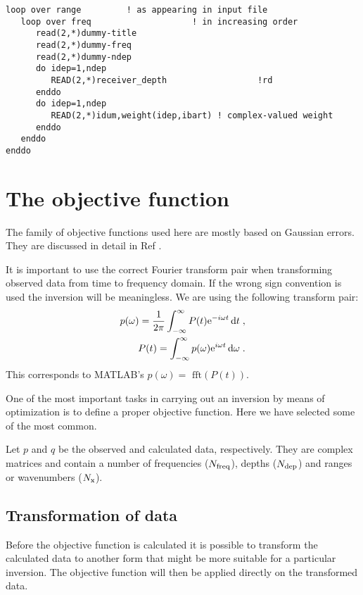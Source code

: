 \documentclass{saclantc}
\begin{document}
\small
\begin{verbatim} 
loop over range         ! as appearing in input file
   loop over freq                    ! in increasing order
      read(2,*)dummy-title
      read(2,*)dummy-freq 
      read(2,*)dummy-ndep
      do idep=1,ndep
         READ(2,*)receiver_depth                  !rd
      enddo
      do idep=1,ndep
         READ(2,*)idum,weight(idep,ibart) ! complex-valued weight
      enddo
   enddo
enddo
\end{verbatim}
\normalsize


\section{The  objective function}
\label{se:obj}
The family of objective functions used here are mostly based
on Gaussian errors. They are discussed in detail in
Ref \cite{mecklennbrauker2000}.

It is  important to use the correct Fourier transform pair when
transforming observed data from time to  frequency domain. If the
wrong sign convention is used the inversion will be meaningless. We
are using the  following transform pair:
\begin{eqnarray}
p(\omega )=
\frac{1}{2 \pi}\int_{-\infty}^{\infty} P(t){\rm e}^{-i\omega t} \, {\rm d}t \; ,\\
P(t)=
\int_{-\infty}^{\infty} p(\omega ) {\rm e}^{i \omega t} \, {\rm d} \omega \; .
\end{eqnarray}
This corresponds to {\sc MATLAB}'s $p(\omega )= \mbox{ fft} (P(t))$. 

One of the most important tasks in carrying out an inversion by means
of optimization is to define a proper objective function. Here we have
selected some of the most common. 

Let $p$ and $q$ be the observed and calculated data, respectively.
They are complex matrices and contain a number of frequencies ($N_{\rm
freq}$), depths ($N_{\rm dep}$) and ranges or wavenumbers ($N_{\rm x}$).


\subsection{Transformation of data}
Before the objective function is calculated it is possible to transform
the calculated data to another form that might be more suitable
for a particular inversion. The objective function will then be applied
directly on the transformed data.
\end{document}
